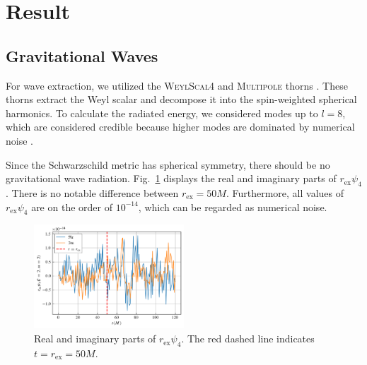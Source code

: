 \documentclass[%
 reprint,
 amsmath,amssymb,
 aps,
 prd,
]{revtex4-2}
\begin{document}
\section{Result}

\subsection{Gravitational Waves}

For wave extraction, we utilized the \textsc{WeylScal4} and \textsc{Multipole} thorns \cite{Baker:2001sf}. These thorns extract the Weyl scalar and decompose it into the spin-weighted spherical harmonics. To calculate the radiated energy, we considered modes up to $l=8$, which are considered credible because higher modes are dominated by numerical noise \cite{Pollney:2009yz}.

Since the Schwarzschild metric has spherical symmetry, there should be no gravitational wave radiation. Fig.~\ref{fig:psi4_r50} displays the real and imaginary parts of $r_\mathrm{ex}\psi_4$. There is no notable difference between $r_\mathrm{ex} = 50M$. Furthermore, all values of $r_\mathrm{ex}\psi_4$ are on the order of $10^{-14}$, which can be regarded as numerical noise.

\begin{figure}[h]
	\includegraphics[width=0.5\textwidth]{data/psi4_r50.png}%
	\caption{\label{fig:psi4_r50} Real and imaginary parts of $r_\mathrm{ex}\psi_4$. The red dashed line indicates $t=r_\mathrm{ex}=50M$.}
\end{figure}
\end{document}
